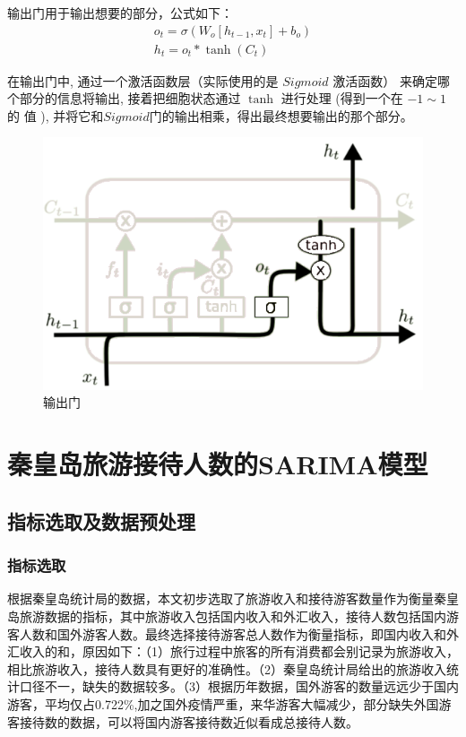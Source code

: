 输出门用于输出想要的部分，公式如下：
\begin{align}
	o_{t}=\sigma\left(W_{o}\left[h_{t-1}, x_{t}\right]+b_{o}\right) \\
	h_{t}=o_{t} * \tanh \left(C_{t}\right)
\end{align}

在输出门中, 通过一个激活函数层（实际使用的是 $Sigmoid$ 激活函数） 来确定哪个部分的信息将输出, 接着把细胞状态通过 $ \tanh $ 进行处理 (得到一个在 $ -1 \sim 1$  的 值 ), 并将它和$ Sigmoid $门的输出相乘，得出最终想要输出的那个部分。

\begin{figure}[h]
	\centering
	\includegraphics[scale=0.5,angle=0]{images/23.png}
	\caption{输出门}
	\label{23}
\end{figure}

\section{秦皇岛旅游接待人数的SARIMA模型}
	\subsection{指标选取及数据预处理}
		\subsubsection{指标选取}
		根据秦皇岛统计局的数据，本文初步选取了旅游收入和接待游客数量作为衡量秦皇岛旅游数据的指标，其中旅游收入包括国内收入和外汇收入，接待人数包括国内游客人数和国外游客人数。最终选择接待游客总人数作为衡量指标，即国内收入和外汇收入的和，原因如下：（1）旅行过程中旅客的所有消费都会别记录为旅游收入，相比旅游收入，接待人数具有更好的准确性。（2）秦皇岛统计局给出的旅游收入统计口径不一，缺失的数据较多。（3）根据历年数据，国外游客的数量远远少于国内游客，平均仅占0.722\%,加之国外疫情严重，来华游客大幅减少，部分缺失外国游客接待数的数据，可以将国内游客接待数近似看成总接待人数。
